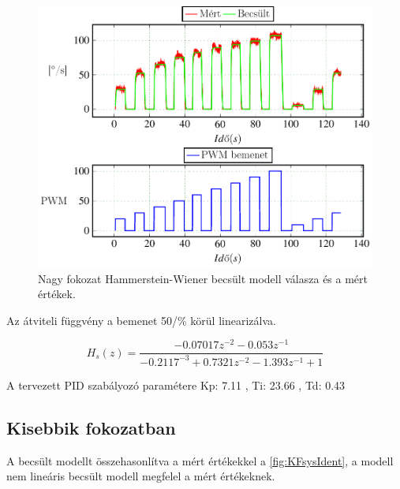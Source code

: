 \begin{figure}[H]
  \includegraphics{tikz/NFsysIdent.pdf}
  \caption{Nagy fokozat Hammerstein-Wiener becsült modell válasza és a mért értékek.}
  \label{fig:NFsysIdent}
\end{figure}


Az átviteli függvény a bemenet 50/\% körül linearizálva.

\begin{equation}
    H_s(z)=\frac{-0.07017z^{-2} -0.053z^{-1}}{-0.2117^{-3}+0.7321z^{-2} -1.393z^{-1} +1}
\end{equation}

A tervezett PID szabályozó paramétere Kp: 7.11 , Ti: 23.66 , Td: 0.43

\subsection{Kisebbik fokozatban}

A becsült modellt összehasonlítva a mért értékekkel a \ref{fig:KFsysIdent}, a modell nem lineáris becsült modell megfelel a mért értékeknek.


